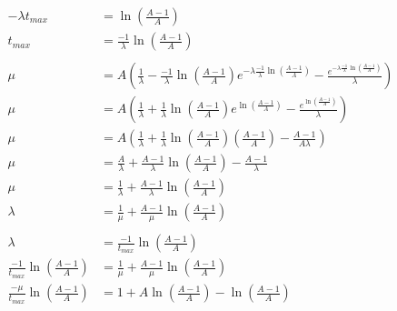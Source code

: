 \documentclass[12pt]{article}
\begin{document}
\begin{align*}
	-\lambda t_{max} &= \ln\left(\frac{A - 1}{A}\right) \\
	t_{max} &= \frac{-1}{\lambda} \ln\left(\frac{A - 1}{A}\right) \\
	\\
	\mu &= A \left(\frac{1}{\lambda} - \frac{-1}{\lambda} \ln\left(\frac{A - 1}{A}\right) e^{-\lambda \frac{-1}{\lambda} \ln\left(\frac{A - 1}{A}\right)} - \frac{e^{-\lambda \frac{-1}{\lambda} \ln\left(\frac{A - 1}{A}\right)}}{\lambda}\right) \\
	\mu &= A \left(\frac{1}{\lambda} + \frac{1}{\lambda} \ln\left(\frac{A - 1}{A}\right) e^{\ln\left(\frac{A - 1}{A}\right)} - \frac{e^{\ln\left(\frac{A - 1}{A}\right)}}{\lambda}\right) \\
	\mu &= A \left(\frac{1}{\lambda} + \frac{1}{\lambda} \ln\left(\frac{A - 1}{A}\right) \left(\frac{A - 1}{A}\right) - \frac{A - 1}{A \lambda}\right) \\
	\mu &= \frac{A}{\lambda} + \frac{A - 1}{\lambda} \ln\left(\frac{A - 1}{A}\right) - \frac{A - 1}{\lambda} \\
	\mu &= \frac{1}{\lambda} + \frac{A - 1}{\lambda} \ln\left(\frac{A - 1}{A}\right) \\
	\lambda &= \frac{1}{\mu} + \frac{A - 1}{\mu} \ln\left(\frac{A - 1}{A}\right) \\
	\\
	\lambda &= \frac{-1}{t_{max}} \ln\left(\frac{A - 1}{A}\right) \\
	\frac{-1}{t_{max}} \ln\left(\frac{A - 1}{A}\right) &= \frac{1}{\mu} + \frac{A - 1}{\mu} \ln\left(\frac{A - 1}{A}\right) \\
	\frac{-\mu}{t_{max}} \ln\left(\frac{A - 1}{A}\right) &= 1 + A \ln\left(\frac{A - 1}{A}\right) - \ln\left(\frac{A - 1}{A}\right) \\
\end{align*}
\end{document}
